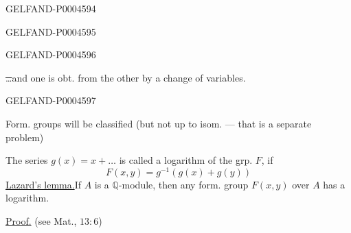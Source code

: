 \begin{GelfandAdjacentEvidence}{GELFAND-P000459}{4}

\end{GelfandAdjacentEvidence}
\begin{GelfandAdjacentEvidence}{GELFAND-P000459}{5}

\end{GelfandAdjacentEvidence}
\begin{GelfandAdjacentEvidence}{GELFAND-P000459}{6}


\sout{\ldots}\quad and one is obt. from the other by a change of variables.
\end{GelfandAdjacentEvidence}
\begin{GelfandAdjacentEvidence}{GELFAND-P000459}{7}


Form. groups will be classified (but not up to isom. — that is a separate problem)

The series $g(x)=x+\ldots$ is called a logarithm of the grp. $F$, if
\[
F(x,y)=g^{-1}(g(x)+g(y))
\]
\underline{Lazard’s lemma.}\quad If $A$ is a $\mathbb Q$-module,
then any form. group $F(x,y)$ over $A$ has a logarithm.
\end{GelfandAdjacentEvidence}


\underline{Proof.} (see Mat., $13:6$)


